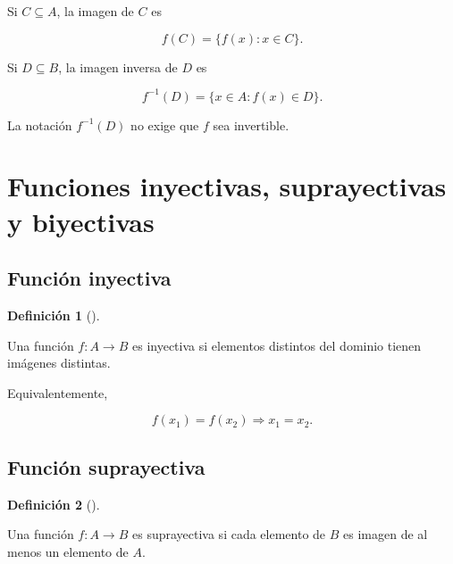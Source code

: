 \documentclass[
  spanish,
  10.5pt,
  letterpaper,
  DIV=11,
  numbers=noendperiod,
  oneside,
  open=any]{scrreprt}
\theoremstyle{definition}
\newtheorem{definition}{Definición}[chapter]
\theoremstyle{definition}
\theoremstyle{plain}
\theoremstyle{remark}
\begin{document}

Si \(C\subseteq A\), la imagen de \(C\) es

\[
f(C)
=
\{f(x):x\in C\}.
\]

Si \(D\subseteq B\), la imagen inversa de \(D\) es

\[
f^{-1}(D)
=
\{x\in A:f(x)\in D\}.
\]

La notación \(f^{-1}(D)\) no exige que \(f\) sea invertible.

\section*{Funciones inyectivas, suprayectivas y
biyectivas}\label{funciones-inyectivas-suprayectivas-y-biyectivas}


\subsection*{Función inyectiva}\label{funciuxf3n-inyectiva}

\begin{definition}[]\protect\hypertarget{def-inyectiva}{}\label{def-inyectiva}

Una función \(f:A\to B\) es inyectiva si elementos distintos del dominio
tienen imágenes distintas.

\end{definition}

Equivalentemente,

\[
f(x_1)=f(x_2)
\Rightarrow
x_1=x_2.
\]

\subsection*{Función suprayectiva}\label{funciuxf3n-suprayectiva}

\begin{definition}[]\protect\hypertarget{def-suprayectiva}{}\label{def-suprayectiva}

Una función \(f:A\to B\) es suprayectiva si cada elemento de \(B\) es
imagen de al menos un elemento de \(A\).

\end{definition}
\end{document}

